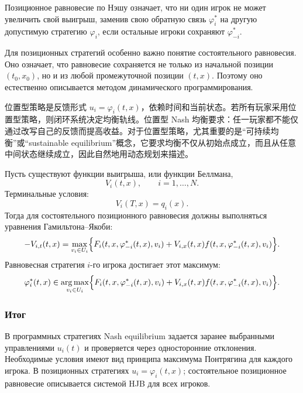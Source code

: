 \documentclass[12pt,a4paper]{article}
\DeclareMathOperator*{\argmax}{arg\,max}
\newcommand{\zh}[1]{\par\noindent #1\par}
\begin{document}
Позиционное равновесие по Нэшу означает, что ни один игрок не может увеличить свой выигрыш, заменив свою обратную связь $\varphi_i^*$ на другую допустимую стратегию $\varphi_i$, если остальные игроки сохраняют $\varphi_{-i}^*$.

Для позиционных стратегий особенно важно понятие состоятельного равновесия. Оно означает, что равновесие сохраняется не только из начальной позиции $(t_0,x_0)$, но и из любой промежуточной позиции $(t,x)$. Поэтому оно естественно описывается методом динамического программирования.
\zh{位置型策略是反馈形式 \(u_i=\varphi_i(t,x)\)，依赖时间和当前状态。若所有玩家采用位置型策略，则闭环系统决定均衡轨线。位置型 Nash 均衡要求：任一玩家都不能仅通过改写自己的反馈而提高收益。对于位置型策略，尤其重要的是“可持续均衡”或“sustainable equilibrium”概念，它要求均衡不仅从初始点成立，而且从任意中间状态继续成立，因此自然地用动态规划来描述。}

Пусть существуют функции выигрыша, или функции Беллмана,
\[
 V_i(t,x),\qquad i=1,\ldots,N.
\]
Терминальные условия:
\[
 V_i(T,x)=q_i(x).
\]
Тогда для состоятельного позиционного равновесия должны выполняться уравнения Гамильтона--Якоби:
\[
 -V_{i,t}(t,x)=\max_{v_i\in U_i}\Bigl\{F_i(t,x,\varphi_{-i}^*(t,x),v_i)+V_{i,x}(t,x)f(t,x,\varphi_{-i}^*(t,x),v_i)\Bigr\}.
\]
Равновесная стратегия $i$-го игрока достигает этот максимум:
\[
 \varphi_i^*(t,x)\in\argmax_{v_i\in U_i}\Bigl\{F_i(t,x,\varphi_{-i}^*(t,x),v_i)+V_{i,x}(t,x)f(t,x,\varphi_{-i}^*(t,x),v_i)\Bigr\}.
\]

\subsubsection{Итог}

В программных стратегиях Nash equilibrium задается заранее выбранными управлениями $u_i(t)$ и проверяется через односторонние отклонения. Необходимые условия имеют вид принципа максимума Понтрягина для каждого игрока. В позиционных стратегиях $u_i=\varphi_i(t,x)$; состоятельное позиционное равновесие описывается системой HJB для всех игроков.



\newpage
{}
\end{document}
